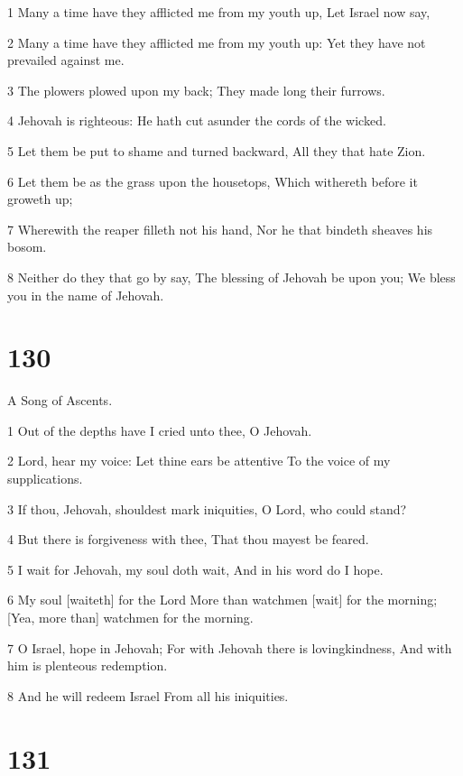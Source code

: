 \par 1 Many a time have they afflicted me from my youth up, Let Israel now say,
\par 2 Many a time have they afflicted me from my youth up: Yet they have not prevailed against me.
\par 3 The plowers plowed upon my back; They made long their furrows.
\par 4 Jehovah is righteous: He hath cut asunder the cords of the wicked.
\par 5 Let them be put to shame and turned backward, All they that hate Zion.
\par 6 Let them be as the grass upon the housetops, Which withereth before it groweth up;
\par 7 Wherewith the reaper filleth not his hand, Nor he that bindeth sheaves his bosom.
\par 8 Neither do they that go by say, The blessing of Jehovah be upon you; We bless you in the name of Jehovah.

\chapter{130}

\par A Song of Ascents.

\par 1 Out of the depths have I cried unto thee, O Jehovah.
\par 2 Lord, hear my voice: Let thine ears be attentive To the voice of my supplications.
\par 3 If thou, Jehovah, shouldest mark iniquities, O Lord, who could stand?
\par 4 But there is forgiveness with thee, That thou mayest be feared.
\par 5 I wait for Jehovah, my soul doth wait, And in his word do I hope.
\par 6 My soul [waiteth] for the Lord More than watchmen [wait] for the morning; [Yea, more than] watchmen for the morning.
\par 7 O Israel, hope in Jehovah; For with Jehovah there is lovingkindness, And with him is plenteous redemption.
\par 8 And he will redeem Israel From all his iniquities.

\chapter{131}

